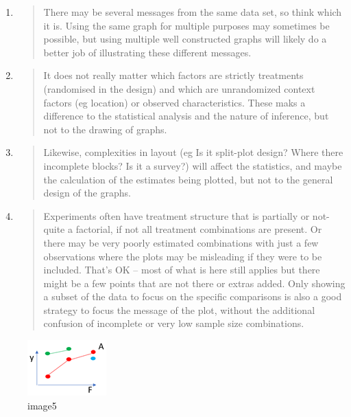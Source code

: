 \documentclass[
  titlepage]{book}
\begin{document}
\begin{enumerate}
\def\labelenumi{\alph{enumi}.}
\item
  \begin{quote}
  There may be several messages from the same data set, so think which it is. Using the same graph for multiple purposes may sometimes be possible, but using multiple well constructed graphs will likely do a better job of illustrating these different messages.
  \end{quote}
\item
  \begin{quote}
  It does not really matter which factors are strictly treatments (randomised in the design) and which are unrandomized context factors (eg location) or observed characteristics. These maks a difference to the statistical analysis and the nature of inference, but not to the drawing of graphs.
  \end{quote}
\item
  \begin{quote}
  Likewise, complexities in layout (eg Is it split-plot design? Where there incomplete blocks? Is it a survey?) will affect the statistics, and maybe the calculation of the estimates being plotted, but not to the general design of the graphs.
  \end{quote}
\item
  \begin{quote}
  Experiments often have treatment structure that is partially or not-quite a factorial, if not all treatment combinations are present. Or there may be very poorly estimated combinations with just a few observations where the plots may be misleading if they were to be included. That's OK -- most of what is here still applies but there might be a few points that are not there or extras added. Only showing a subset of the data to focus on the specific comparisons is also a good strategy to focus the message of the plot, without the additional confusion of incomplete or very low sample size combinations.
  \end{quote}
\end{enumerate}

\begin{figure}
\centering
\includegraphics{img/Picture5.png}
\caption{image5}
\end{figure}
\end{document}
